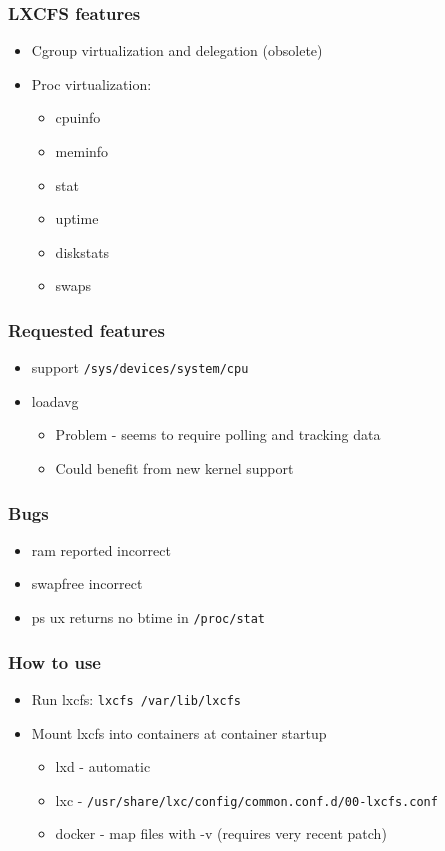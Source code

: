 \documentclass{beamer}
\begin{document}
\begin{frame}
\frametitle{LXCFS features}
	\begin{itemize}
	\item Cgroup virtualization and delegation (obsolete)
	\item Proc virtualization:
		\begin{itemize}
		\item cpuinfo
		\item meminfo
		\item stat
		\item uptime
		\item diskstats
		\item swaps
		\end{itemize}
	\end{itemize}
\end{frame}

\begin{frame}
\frametitle{Requested features}
	\begin{itemize}
	\item support {\tt /sys/devices/system/cpu}
	\item loadavg
		\begin{itemize}
		\item Problem - seems to require polling and tracking data
		\item Could benefit from new kernel support
		\end{itemize}
	\end{itemize}
\end{frame}

\begin{frame}
\frametitle{Bugs}
	\begin{itemize}
	\item ram reported incorrect
	\item swapfree incorrect
	\item ps ux returns no btime in {\tt /proc/stat}
	\end{itemize}
\end{frame}

\lstset{language=bash}

\begin{frame}
\frametitle{How to use}
\begin{itemize}
\item Run lxcfs: {\tt lxcfs /var/lib/lxcfs}

\item Mount lxcfs into containers at container startup
	\begin{itemize}
	\item lxd - automatic
	\item lxc - {\tt /usr/share/lxc/config/common.conf.d/00-lxcfs.conf}
	\item docker - map files with -v (requires very recent patch)
	\end{itemize}
\end{itemize}

\newpage

{\tiny

}
\end{frame}
\end{document}
